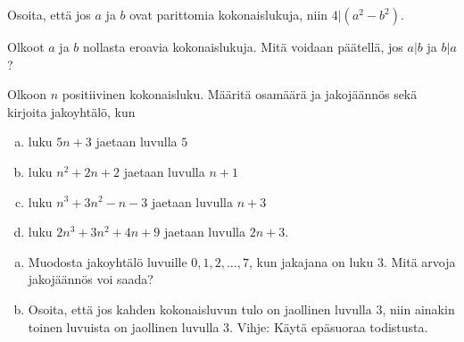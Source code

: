 \begin{tehtavasivu}
\begin{tehtava}
	Osoita, että jos $a$ ja $b$ ovat parittomia kokonaislukuja, niin $4 | (a^2 - b^2)$.
\end{tehtava}

\begin{tehtava}
	Olkoot $a$ ja $b$ nollasta eroavia kokonaislukuja. Mitä voidaan päätellä, jos $a|b$ ja $b|a$?
\end{tehtava}

\begin{tehtava}
	Olkoon $n$ positiivinen kokonaisluku. Määritä osamäärä ja jakojäännös sekä kirjoita jakoyhtälö, kun
	\begin{enumerate}[a)]
	\item luku $5n + 3$ jaetaan luvulla $5$
	\item luku $n^2 + 2n + 2$ jaetaan luvulla $n + 1$
	\item luku $n^3 + 3n^2 - n - 3$ jaetaan luvulla $n + 3$
	\item luku $2n^3 + 3n^2 + 4n + 9$ jaetaan luvulla $2n + 3$.
	\end{enumerate}
\end{tehtava}


\begin{tehtava}
	\begin{enumerate}[a)]
	\item Muodosta jakoyhtälö luvuille $0, 1, 2, \ldots, 7$, kun jakajana on luku $3$. Mitä arvoja jakojäännös voi saada?
	\item Osoita, että jos kahden kokonaisluvun tulo on jaollinen luvulla $3$, niin ainakin toinen luvuista on jaollinen luvulla $3$. Vihje: Käytä epäsuoraa todistusta.
	\end{enumerate}
\end{tehtava}

\end{tehtavasivu}

\setcounter{tehtava}{0}

